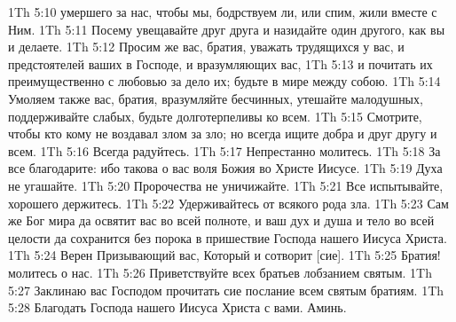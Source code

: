 1Th 5:10  умершего за нас, чтобы мы, бодрствуем ли, или спим, жили вместе с Ним.
1Th 5:11  Посему увещавайте друг друга и назидайте один другого, как вы и делаете.
1Th 5:12  Просим же вас, братия, уважать трудящихся у вас, и предстоятелей ваших в Господе, и вразумляющих вас,
1Th 5:13  и почитать их преимущественно с любовью за дело их; будьте в мире между собою.
1Th 5:14  Умоляем также вас, братия, вразумляйте бесчинных, утешайте малодушных, поддерживайте слабых, будьте долготерпеливы ко всем.
1Th 5:15  Смотрите, чтобы кто кому не воздавал злом за зло; но всегда ищите добра и друг другу и всем.
1Th 5:16  Всегда радуйтесь.
1Th 5:17  Непрестанно молитесь.
1Th 5:18  За все благодарите: ибо такова о вас воля Божия во Христе Иисусе.
1Th 5:19  Духа не угашайте.
1Th 5:20  Пророчества не уничижайте.
1Th 5:21  Все испытывайте, хорошего держитесь.
1Th 5:22  Удерживайтесь от всякого рода зла.
1Th 5:23  Сам же Бог мира да освятит вас во всей полноте, и ваш дух и душа и тело во всей целости да сохранится без порока в пришествие Господа нашего Иисуса Христа.
1Th 5:24  Верен Призывающий вас, Который и сотворит [сие].
1Th 5:25  Братия! молитесь о нас.
1Th 5:26  Приветствуйте всех братьев лобзанием святым.
1Th 5:27  Заклинаю вас Господом прочитать сие послание всем святым братиям.
1Th 5:28  Благодать Господа нашего Иисуса Христа с вами. Аминь.


